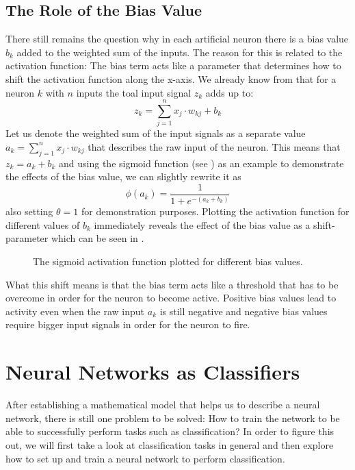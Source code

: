 \subsection{The Role of the Bias Value}
\label{sec:bias}
There still remains the question why in each artificial neuron there
is a bias value \(b_k\) added to the weighted sum of the inputs. The
reason for this is related to the activation function: The bias term
acts like a parameter that determines how to shift the activation
function along the x-axis. We already know from  that
for a neuron \(k\) with \(n\) inputs the toal input signal \(z_k\)
adds up to:
\begin{equation*}
  z_k = \sum_{j=1}^{n}{x_j \cdot w_{kj}} + b_k
\end{equation*}
Let us denote the weighted sum of the input signals as a separate
value \(a_k = \sum_{j=1}^{n}{x_j \cdot w_{kj}}\) that describes the raw
input of the neuron. This means that \(z_k
= a_k + b_k\) and using the sigmoid function (see ) as an example to
demonstrate the effects of the bias value, we can slightly rewrite it as
\begin{equation*}
  \phi(a_k) = \frac{1}{1+e^{-(a_k+b_k)}}
\end{equation*}
also setting \(\theta = 1\) for demonstration purposes. Plotting the
activation function for
different values of \(b_k\) immediately reveals the effect of the bias
value as a shift-parameter which can be seen in .
\begin{figure}[h]
  \centering
  
  \caption{The sigmoid activation function plotted for different bias values.}
  \label{fig:bias}
\end{figure}

What this shift means is that the bias term acts like a threshold that
has to be overcome in order for the neuron to become active. Positive
bias values lead to activity even when the raw input \(a_k\) is still
negative and negative bias values require bigger input signals in
order for the neuron to fire.

\section{Neural Networks as Classifiers}

After establishing a mathematical model that helps us to describe a
neural network, there is still one problem to be solved: How to train
the network to be able to successfully perform tasks such as
classification? In order to figure this out, we will first take a look at
classification tasks in general and then explore how to set up and
train a neural network to perform classification.

